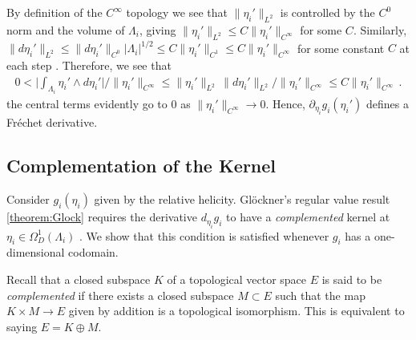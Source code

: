 \documentclass[11pt]{article}
\theoremstyle{plain}
\theoremstyle{definition}
\theoremstyle{remark}
\newcommand{\ST}{\Lambda}
\begin{document}
By definition of the \(C^\infty\) topology we see that \(\| \eta_i' \|_{L^2}\) is controlled by the \(C^0\) norm and the volume of \(\ST_i\), giving \( \| \eta_i' \|_{L^2} \leq C \| \eta_i' \|_{C^\infty}\) for some \(C\). Similarly, \(\|  d \eta_i'  \|_{L^2} \leq \|  d \eta_i'  \|_{C^0} | \ST_i |^{1/2} \leq C \|  \eta_i'  \|_{C^1} \leq C \|  \eta_i'  \|_{C^\infty} \) for some constant \(C\) at each step \cite{warner1983foundations}. Therefore, we see that 
\begin{align*}
    0 < \Big| \int_{\ST_i}  \eta_i'  \wedge d \eta_i' \Big|  / \| \eta_i' \|_{C^\infty} \leq \| \eta_i' \|_{L^2} \, \|  d \eta_i'  \|_{L^2}  / \| \eta_i' \|_{C^\infty}  \leq C \| \eta_i' \|_{C^\infty} \, .
\end{align*}
the central terms evidently go to 0 as \(\| \eta_i' \|_{C^\infty} \to 0 \). Hence, \(\partial_{\eta_i} g_i(  \eta_i'  )\) defines a Fr\'echet derivative. 





\subsection{Complementation of the Kernel}\label{app:Complemented}

Consider \(g_i(\eta_i)\) given by the relative helicity. Gl\"ockner's regular value result \ref{theorem:Glock} requires the derivative $d_{\eta_i} g_i$ to have a \emph{complemented} kernel at $\eta_i \in \Omega_D^1(\ST_i)$ \cite{glockner2015fundamentals}. We show that this condition is satisfied whenever $g_i$ has a one-dimensional codomain.


Recall that a closed subspace $K$ of a topological vector space $E$ is said to be \emph{complemented} if there exists a closed subspace $M \subset E$ such that the map 
$K \times M \to E$ given by addition is a topological isomorphism. This is equivalent to saying $E = K \oplus M$.
\end{document}
